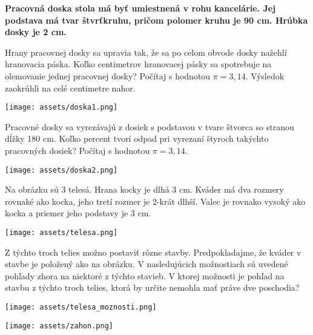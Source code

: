 \textbf{Pracovná doska stola má byť umiestnená v rohu kancelárie. Jej podstava má tvar štvrťkruhu, pričom polomer kruhu je 90 cm. Hrúbka dosky je 2 cm.}

\begin{example}
	Hrany pracovnej dosky sa upravia tak, že sa po celom obvode dosky nažehlí hranovacia páska.
	Koľko centimetrov hranovacej pásky sa spotrebuje na olemovanie jednej pracovnej dosky?
	Počítaj s hodnotou $\pi = 3,14$. Výsledok zaokrúhli na celé centimetre nahor. 
	
	\begin{center}
		\texttt{[image: assets/doska1.png]}
	\end{center}
\end{example}

\begin{example}
	Pracovné dosky sa vyrezávajú z dosiek s podstavou v tvare štvorca so stranou dĺžky 180 cm.
	Koľko percent tvorí odpad pri vyrezaní štyroch takýchto pracovných dosiek? Počítaj s hodnotou
	$\pi= 3,14$. 
	
	\begin{center}
		\texttt{[image: assets/doska2.png]}
	\end{center}
\end{example}

\begin{example}
	Na obrázku sú 3 telesá. Hrana kocky je dlhá 3 cm. Kváder má dva rozmery rovnaké ako kocka,
	jeho tretí rozmer je 2-krát dlhší. Valec je rovnako vysoký ako kocka a priemer jeho podstavy
	je 3 cm.
	
	\begin{center}
		\texttt{[image: assets/telesa.png]}
	\end{center}
	
	Z týchto troch telies možno postaviť rôzne stavby. Predpokladajme, že kváder v stavbe
	je položený ako na obrázku. V nasledujúcich možnostiach sú uvedené pohľady zhora
	na niektoré z týchto stavieb. V ktorej možnosti je pohľad na stavbu z týchto troch telies, ktorá by určite nemohla mať práve dve poschodia?
	
	\begin{center}
		\texttt{[image: assets/telesa\_moznosti.png]}
	\end{center}
\end{example}

\begin{center}
	\texttt{[image: assets/zahon.png]}
\end{center}

